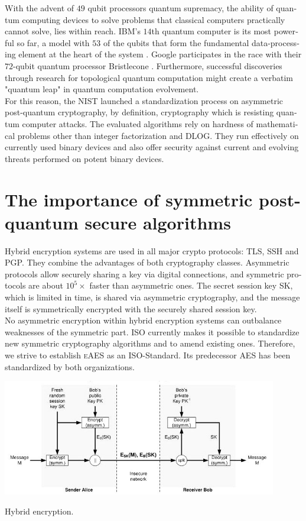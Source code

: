\documentclass[a4paper,11pt]{article}
\begin{document}
\begin{otherlanguage}{english}
\noindent
With the advent of $49$ qubit processors quantum supremacy, the ability of quantum computing devices to solve problems that classical computers practically cannot solve,  lies within reach. IBM's $14$th quantum computer is its most powerful so far, a model with $53$ of the qubits that form the fundamental data-processing element at the heart of the system \cite{MSN}. Google participates in the race with their $72$-qubit quantum processor Bristlecone \cite{googleai}.  Furthermore, successful discoveries through research for topological quantum computation \cite{TQB} might create a verbatim "quantum leap" in quantum computation evolvement. \\

\noindent
For this reason, the NIST launched a standardization process on asymmetric post-quantum cryptography, by definition, cryptography which is resisting quantum computer attacks. The evaluated algorithms rely on hardness of mathematical problems other than integer factorization and DLOG. They run effectively on currently used binary devices and also offer security against current and evolving threats performed on potent binary devices.\\


\section{The importance of symmetric post-quantum secure algorithms}

\noindent
Hybrid encryption systems are used in all major crypto protocols: TLS, SSH and PGP. They combine the advantages of both cryptography classes. Asymmetric protocols allow securely sharing a key via digital connections, and symmetric protocols are about $10^5 \times$ faster than asymmetric ones. The secret session key SK, which is limited in time, is shared via asymmetric cryptography, and the message itself is symmetrically encrypted with the securely shared session key.\\

\noindent
No asymmetric encryption within hybrid encryption systems can outbalance weaknesses of the symmetric part. ISO currently makes it possible to standardize new symmetric cryptography algorithms and to amend existing ones. Therefore, we strive to establish \textsc{eAES} as an ISO-Standard. Its predecessor \textsc{AES} has been standardized by both organizations. \\

\begin{figurehere}
  \centering
  \includegraphics[width=12cm]{hybrid-encryption.jpg}
  \caption{Hybrid encryption.\label{abb_1}}
\end{figurehere}


\end{otherlanguage}
\end{document}
